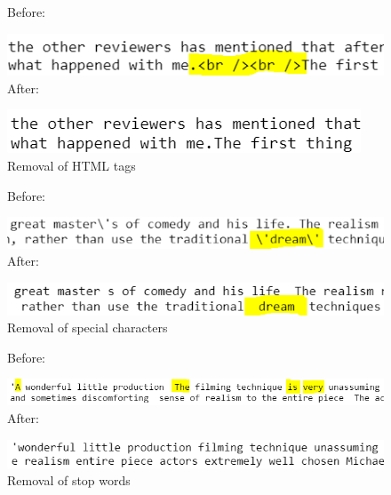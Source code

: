 \documentclass[10pt,twocolumn,letterpage]{article}
\begin{document}
			\begin{figure}[htbp]
				\textsf{Before:}
				
				\includegraphics[width = \columnwidth]{html_tag}
				\textsf{After:}
				
				\includegraphics[width = \columnwidth]{html_tag_removed}
				\caption{Removal of HTML tags}
			\end{figure}
	
			\begin{figure}[htbp]
				\textsf{Before:}
				
				\includegraphics[width = \columnwidth]{special_char}
				\textsf{After:}
				
				\includegraphics[width = \columnwidth]{special_char_removed}
				\caption{Removal of special characters}
			\end{figure}
	
			\begin{figure}[htbp]
				\textsf{Before:}
			
				\includegraphics[width = \columnwidth]{stop_words}
				\textsf{After:}
			
				\includegraphics[width = \columnwidth]{stop_words_removed}
				\caption{Removal of stop words}
			\end{figure}
\end{document}
